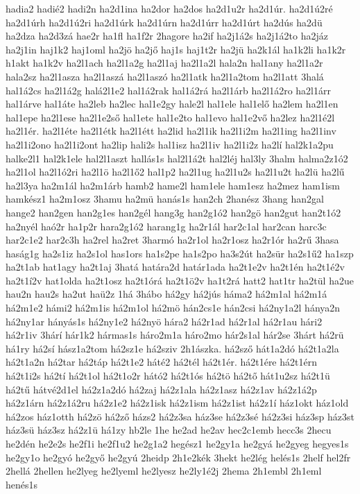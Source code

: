 {hadia2
hadié2
hadi2n
ha2d1ina
ha2dor
ha2dos
ha2d1u2r
ha2d1úr.
ha2d1ú2ré
ha2d1úrh
ha2d1ú2ri
ha2d1úrk
ha2d1úrn
ha2d1úrr
ha2d1úrt
ha2dús
ha2dü
ha2dza
ha2d3zá
hae2r
ha1fl
ha1f2r
2hagore
ha2if
ha2j1á2s
ha2j1á2to
ha2jáz
ha2j1in
haj1k2
haj1oml
ha2jö
ha2jő
haj1s
haj1t2r
ha2jü
ha2k1ál
ha1k2li
ha1k2r
h1akt
ha1k2v
ha2l1ach
ha2l1a2g
ha2l1aj
ha2l1a2l
hala2n
hal1any
ha2l1a2r
hala2sz
ha2l1asza
ha2l1aszá
ha2l1aszó
ha2l1atk
ha2l1a2tom
ha2l1att
3halá
hal1á2cs
ha2l1á2g
halá2l1e2
hal1á2rak
hal1á2rá
ha2l1árb
ha2l1á2ro
ha2l1árr
hal1árve
hal1áte
ha2leb
ha2lec
hal1e2gy
hale2l
hal1ele
hal1elő
ha2lem
ha2l1en
hal1epe
ha2l1ese
ha2l1e2ső
hal1ete
hal1e2to
hal1evo
hal1e2vő
ha2lez
ha2l1é2l
ha2l1ér.
ha2l1éte
ha2l1étk
ha2l1étt
ha2lid
ha2l1ik
ha2l1i2m
ha2l1ing
ha2l1inv
ha2l1i2ono
ha2l1i2ont
ha2lip
hali2s
hal1isz
ha2l1iv
ha2l1i2z
ha2lí
hal2k1a2pu
halke2l1
hal2k1ele
hal2l1aszt
hallás1s
hal2l1á2t
hal2léj
hal3ly
3halm
halma2z1ó2
ha2l1ol
ha2l1ó2ri
ha2l1ö
ha2l1ő2
hal1p2
ha2l1ug
ha2l1u2s
ha2l1u2t
ha2lü
ha2lű
ha2l3ya
ha2m1ál
ha2m1árb
hamb2
hame2l
ham1ele
ham1esz
ha2mez
ham1ism
hamkész1
ha2m1osz
3hamu
ha2mü
hanás1s
han2ch
2hanész
3hang
han2gal
hange2
han2gen
han2g1es
han2gél
hang3g
han2g1ó2
han2gö
han2gut
han2t1ó2
ha2nyél
haó2r
ha1p2r
hara2g1ó2
harang1g
ha2r1ál
har2c1al
har2can
harc3c
har2c1e2
har2c3h
ha2rel
ha2ret
3harmó
ha2r1ol
ha2r1osz
ha2r1ór
ha2rű
3hasa
haság1g
ha2s1iz
ha2s1ol
has1ors
ha1s2pe
ha1s2po
ha3s2út
ha2sür
ha2s1ű2
ha1szp
ha2t1ab
hat1agy
ha2t1aj
3hatá
határa2d
határ1ada
ha2t1e2v
ha2t1én
ha2t1é2v
ha2t1í2v
hat1olda
ha2t1osz
ha2t1órá
ha2t1ö2v
ha1t2rá
hatt2
hat1tr
ha2tül
ha2ue
hau2n
hau2s
ha2ut
haü2z
1há
3hábo
há2gy
há2jús
háma2
há2m1al
há2m1á
há2m1e2
hámi2
há2m1is
há2m1ol
há2mö
hán2cs1e
hán2csi
há2ny1a2l
hánya2n
há2ny1ar
hányás1s
há2ny1e2
há2nyö
hára2
há2r1ad
há2r1al
há2r1au
hári2
há2r1iv
3hárí
hár1k2
hármas1s
háro2m1a
háro2mo
hár2s1al
hár2se
3hárt
há2rü
há1ry
há2sí
hász1a2tom
há2sz1e
há2sziv
2h1ászka.
há2sző
hát1a2dó
há2t1a2la
há2t1a2n
há2tar
há2táp
há2t1e2
háté2
há2tél
há2t1ér.
há2t1ére
há2t1érn
há2t1i2s
há2tí
há2t1ol
há2t1o2r
hátó2
há2t1ós
há2tö
há2tő
hát1u2sz
há2t1ü
há2tű
hátvé2d1el
há2z1a2dó
há2zaj
há2z1ala
há2z1asz
há2z1av
há2z1á2p
há2z1árn
há2z1á2ru
há2z1e2
há2z1isk
há2z1ism
há2z1ist
há2z1í
ház1okt
ház1old
há2zos
ház1otth
há2zö
há2ző
házs2
há2z3sa
ház3se
há2z3sé
há2z3si
ház3sp
ház3st
ház3sü
ház3sz
há2z1ü
há1zy
hb2le
1he
he2ad
he2av
hec2c1emb
hecc3s
2hecu
he2dén
he2e2s
he2f1i
he2f1u2
he2g1a2
hegész1
he2gy1a
he2gyá
he2gyeg
hegyes1s
he2gy1o
he2gyó
he2győ
he2gyú
2heidp
2h1e2kék
3hekt
he2lég
helés1s
2helf
hel2fr
2hellá
2hellen
he2lyeg
he2lyeml
he2lyesz
he2ly1é2j
2hema
2h1embl
2h1eml
henés1s
}
